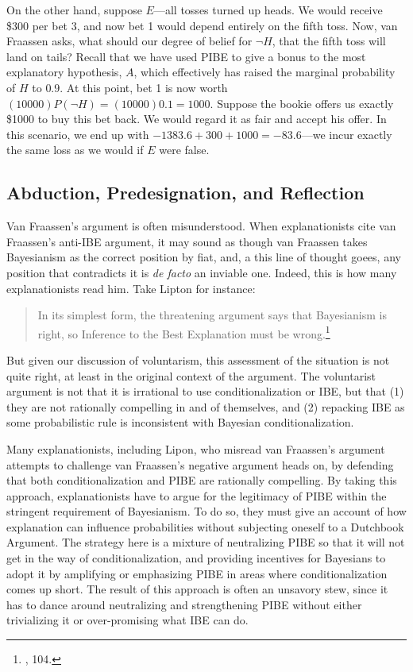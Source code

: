 On the other hand, suppose \(E\)---all tosses turned up heads. We would
receive \$300 per bet 3, and now bet 1 would depend entirely on the
fifth toss. Now, van Fraassen asks, what should our degree of belief for
\(\neg H\), that the fifth toss will land on tails? Recall that we have
used PIBE to give a bonus to the most explanatory hypothesis, \(A\),
which effectively has raised the marginal probability of \(H\) to
\(0.9\). At this point, bet 1 is now worth
\((10000)P(\neg H) = (10000)0.1 = 1000\). Suppose the bookie offers us
exactly \$1000 to buy this bet back. We would regard it as fair and
accept his offer. In this scenario, we end up with
\(-1383.6+300+1000 = -83.6\)---we incur exactly the same loss as we
would if \(E\) were false.

\hypertarget{abduction-predesignation-and-reflection}{%
\subsection{Abduction, Predesignation, and
Reflection}\label{abduction-predesignation-and-reflection}}

Van Fraassen's argument is often misunderstood. When explanationists
cite van Fraassen's anti-IBE argument, it may sound as though van
Fraassen takes Bayesianism as the correct position by fiat, and, a this line of thought goees, any position that contradicts it is \emph{de facto} an inviable one. Indeed,
this is how many explanationists read him. Take Lipton for instance:

\begin{quote}
In its simplest form, the threatening argument says that Bayesianism is
right, so Inference to the Best Explanation must be wrong.\footnote{\cite{lipton}, 104.}
\end{quote}

But given our discussion of voluntarism, this assessment of the
situation is not quite right, at least in the original context of the
argument. The voluntarist argument is not that it is irrational to use
conditionalization or IBE, but that (1) they are not rationally
compelling in and of themselves, and (2) repacking IBE as some
probabilistic rule is inconsistent with Bayesian conditionalization.

Many explanationists, including Lipon, who misread van Fraassen's
argument attempts to challenge van Fraassen's negative argument heads
on, by defending that both conditionalization and PIBE are rationally
compelling. By taking this approach, explanationists have to argue for
the legitimacy of PIBE within the stringent requirement of Bayesianism.
To do so, they must give an account of how explanation can influence
probabilities without subjecting oneself to a Dutchbook Argument. The
strategy here is a mixture of neutralizing PIBE so that it will not get
in the way of conditionalization, and providing incentives for Bayesians
to adopt it by amplifying or emphasizing PIBE in areas where
conditionalization comes up short. The result of this approach is often
an unsavory stew, since it has to dance around neutralizing and
strengthening PIBE without either trivializing it or over-promising what
IBE can do.

